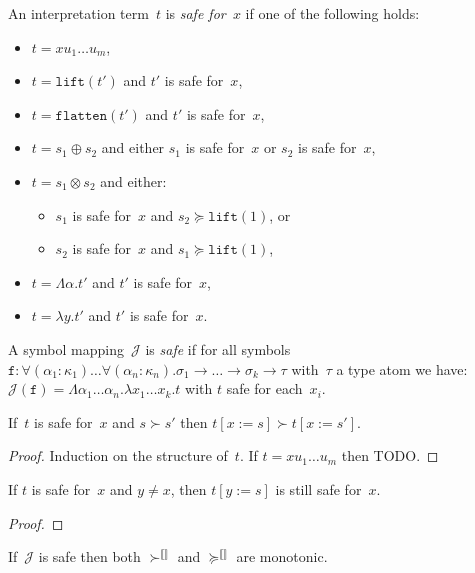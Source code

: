 \documentclass[runningheads,a4paper]{llncs}
\newcommand{\Termmap}{\mathcal{J}}
\newcommand{\succinterpret}{\succ^{\llbracket\rrbracket}}
\newcommand{\succeqinterpret}{\succeq^{\llbracket\rrbracket}}
\newcommand{\arrtype}{\rightarrow}
\newcommand{\abs}[2]{\lambda #1.#2}
\newcommand{\tabs}[2]{\Lambda #1.#2}
\newcommand{\subst}[2]{#1:=#2}
\newcommand{\flatten}{\mathtt{flatten}}
\newcommand{\lift}{\mathtt{lift}}
\newcommand{\afun}{\mathtt{f}}
\begin{document}
\begin{definition}\normalfont
  An interpretation term~$t$ is \emph{safe for~$x$} if one of the
  following holds:
  \begin{itemize}
  \item $t = x u_1 \ldots u_m$,
  \item $t = \lift(t')$ and $t'$ is safe for~$x$,
  \item $t = \flatten(t')$ and $t'$ is safe for~$x$,
  \item $t = s_1 \oplus s_2$ and either $s_1$ is safe for~$x$ or $s_2$
    is safe for~$x$,
  \item $t = s_1 \otimes s_2$ and either:
    \begin{itemize}
    \item $s_1$ is safe for~$x$ and $s_2 \succeq \lift(1)$, or
    \item $s_2$ is safe for~$x$ and $s_1 \succeq \lift(1)$,
    \end{itemize}
  \item $t = \tabs{\alpha}{t'}$ and $t'$ is safe for~$x$,
  \item $t = \abs{y}{t'}$ and $t'$ is safe for~$x$.
  \end{itemize}
  A symbol mapping~$\Termmap$ is \emph{safe} if for all symbols $\afun
  : \forall (\alpha_1 : \kappa_1) \ldots \forall (\alpha_n : \kappa_n)
  . \sigma_1 \arrtype \ldots \arrtype \sigma_k \arrtype \tau$
  with~$\tau$ a type atom we have: $\Termmap(\afun) = \tabs{\alpha_1
    \dots \alpha_n}{\abs{x_1 \dots x_k}{t}}$ with $t$ safe for
  each~$x_i$.
\end{definition}

\begin{lemma}
  If~$t$ is safe for~$x$ and $s \succ s'$ then $t[\subst{x}{s}] \succ
  t[\subst{x}{s'}]$.
\end{lemma}

\begin{proof}
  Induction on the structure of~$t$. If $t = x u_1 \ldots u_m$ then
  TODO.
\end{proof}

\begin{lemma}
  If $t$ is safe for~$x$ and $y \ne x$, then $t[\subst{y}{s}]$ is
  still safe for~$x$.
\end{lemma}

\begin{proof}
\end{proof}

\begin{lemma}
  If~$\Termmap$ is safe then both $\succinterpret$ and
  $\succeqinterpret$ are monotonic.
\end{lemma}
\end{document}
